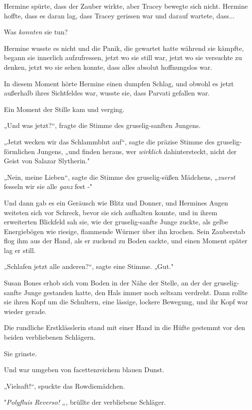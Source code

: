 {Hermine spürte, dass der Zauber wirkte, aber Tracey bewegte sich nicht. Hermine hoffte, dass es daran lag, dass Tracey gerissen war und darauf wartete, dass...

Was \emph{konnten} sie tun?

Hermine wusste es nicht und die Panik, die gewartet hatte während sie kämpfte, begann sie innerlich aufzufressen, jetzt wo sie still war, jetzt wo sie versuchte zu denken, jetzt wo sie sehen konnte, dass alles absolut hoffnungslos war.

In diesem Moment hörte Hermine einen dumpfen Schlag, und obwohl es jetzt außerhalb ihres Sichtfeldes war, wusste sie, dass Parvati gefallen war.

Ein Moment der Stille kam und verging.

„Und was jetzt?“, fragte die Stimme des gruselig-sanften Jungens.

„Jetzt wecken wir das Schlammblut auf“, sagte die präzise Stimme des gruselig-förmlichen Jungens, „und finden heraus, wer \emph{wirklich} dahintersteckt, nicht der Geist von Salazar Slytherin."

„Nein, meine Lieben“, sagte die Stimme des gruselig-süßen Mädchens, „\emph{zuerst} fesseln wir sie alle \emph{ganz} fest -"

Und dann gab es ein Geräusch wie Blitz und Donner, und Hermines Augen weiteten sich vor Schreck, bevor sie sich aufhalten konnte, und in ihrem erweiterten Blickfeld sah sie, wie der gruselig-sanfte Junge zuckte, als gelbe Energiebögen wie riesige, flammende Würmer über ihn krochen. Sein Zauberstab flog ihm aus der Hand, als er zuckend zu Boden sackte, und einen Moment später lag er still.

„Schlafen jetzt alle anderen?“, sagte eine Stimme. „Gut."

Susan Bones erhob sich vom Boden in der Nähe der Stelle, an der der gruselig-sanfte Junge gestanden hatte, den Hals immer noch seltsam verdreht. Dann rollte sie ihren Kopf um die Schultern, eine lässige, lockere Bewegung, und ihr Kopf war wieder gerade.

Die rundliche Erstklässlerin stand mit einer Hand in die Hüfte gestemmt vor den beiden verbliebenen Schlägern.

Sie grinste.

Und war umgeben von facettenreichem blauen Dunst.

„Vielsaft!“, spuckte das Rowdiemädchen.

"\emph{Polyfluis Reverso!} „, brüllte der verbliebene Schläger.

}
